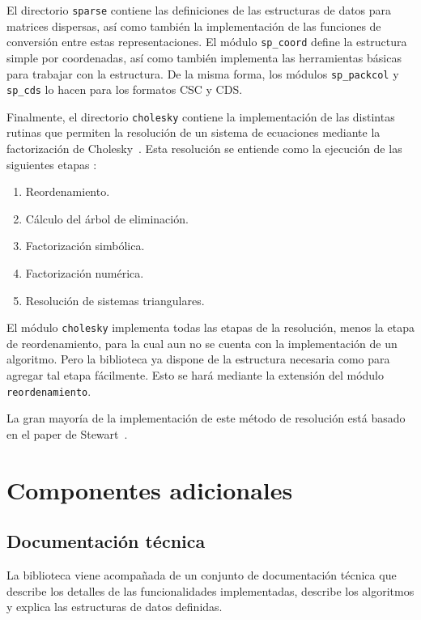 \documentclass[a4paper,10pt]{article}
\begin{document}
El directorio \texttt{sparse} contiene las definiciones de las estructuras de datos para matrices dispersas, así como también la implementación de las funciones de conversión entre estas representaciones.
El módulo \texttt{sp\_coord} define la estructura simple por coordenadas, así como también implementa las herramientas básicas para trabajar con la estructura. De la misma forma, los módulos \texttt{sp\_packcol} y \texttt{sp\_cds} lo hacen para los formatos CSC y CDS.

Finalmente, el directorio \texttt{cholesky} contiene la implementación de las distintas rutinas que permiten la resolución de un sistema de ecuaciones mediante la factorización de Cholesky~\cite{duff}. Esta resolución se entiende como la ejecución de las siguientes etapas \cite{george}:
\begin{enumerate}
 \item Reordenamiento.
 \item Cálculo del árbol de eliminación.
 \item Factorización simbólica.
 \item Factorización numérica.
 \item Resolución de sistemas triangulares.
\end{enumerate}

\pagebreak
El módulo \texttt{cholesky} implementa todas las etapas de la resolución, menos la etapa de reordenamiento, para la cual aun no se cuenta con la implementación de un algoritmo. Pero la biblioteca ya dispone de la estructura necesaria como para agregar tal etapa fácilmente. Esto se hará mediante la extensión del módulo \texttt{reordenamiento}.

La gran mayoría de la implementación de este método de resolución está basado en el paper de Stewart~\cite{stewart}. 


\section{Componentes adicionales}
\label{sec_componentes}
\subsection{Documentación técnica}
La biblioteca viene acompañada de un conjunto de documentación técnica que describe los detalles de las funcionalidades implementadas, describe los algoritmos y explica las estructuras de datos definidas.
\end{document}
